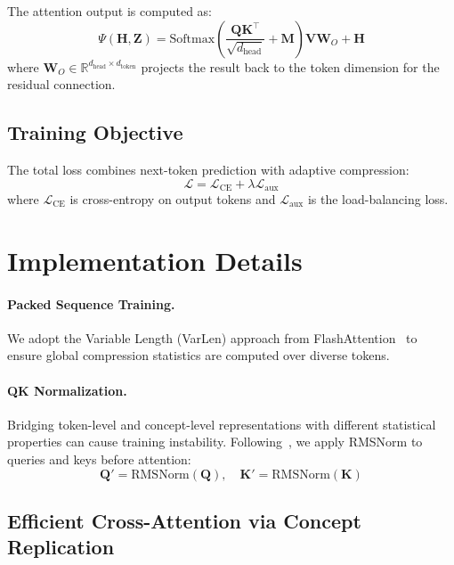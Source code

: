 The attention output is computed as:
\begin{equation}
    \Psi(\mathbf{H}, \mathbf{Z}) = \text{Softmax}\left( \frac{\mathbf{Q}\mathbf{K}^\top}{\sqrt{d_{\text{head}}}} + \mathbf{M} \right) \mathbf{V}\mathbf{W}_O + \mathbf{H}
    \label{eq:cross_attn}
\end{equation}
where $\mathbf{W}_O \in \mathbb{R}^{d_{\text{head}} \times d_{\text{token}}}$ projects the result back to the token dimension for the residual connection.

\subsection{Training Objective}

The total loss combines next-token prediction with adaptive compression:
\begin{equation}
    \mathcal{L} = \mathcal{L}_{\text{CE}} + \lambda \mathcal{L}_{\text{aux}}
\end{equation}
where $\mathcal{L}_{\text{CE}}$ is cross-entropy on output tokens and $\mathcal{L}_{\text{aux}}$ is the load-balancing loss.

\section{Implementation Details}

\paragraph{Packed Sequence Training.}
We adopt the Variable Length (VarLen) approach from FlashAttention~\cite{dao2022flashattention} to ensure global compression statistics are computed over diverse tokens.

\paragraph{QK Normalization.}
Bridging token-level and concept-level representations with different statistical properties can cause training instability. Following~\cite{henry2020query, dehghani2023scaling}, we apply RMSNorm to queries and keys before attention:
\begin{equation}
    \mathbf{Q}' = \text{RMSNorm}(\mathbf{Q}), \quad \mathbf{K}' = \text{RMSNorm}(\mathbf{K})
\end{equation}

\subsection{Efficient Cross-Attention via Concept Replication}

